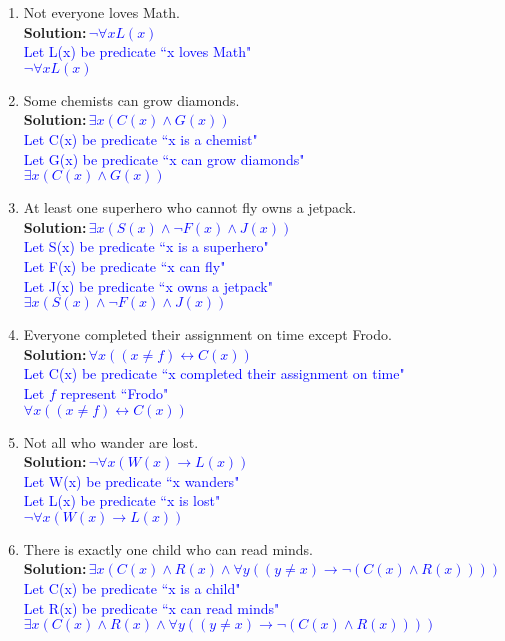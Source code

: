 \documentclass{article}
\renewcommand{\implies}{\rightarrow}
\newcommand{\sol}[1]{\textbf{Solution:\,}\textcolor{blue}{#1}}
\begin{document}
\begin{enumerate}
\begin{enumerate}
\item Not everyone loves Math.
\\\sol{$ \neg\forall x L(x)$
\\Let L(x) be predicate ``x loves Math"
\\$ \neg\forall x L(x)$
}
\item Some chemists can grow diamonds. 
\\\sol{$\exists x (C(x)\land G(x))$
\\Let C(x) be predicate ``x is a chemist"
\\Let G(x) be predicate ``x can grow diamonds"
\\$\exists x (C(x)\land G(x))$
}
\item At least one superhero who cannot fly owns a jetpack.
\\\sol{$\exists x (S(x)\land \neg F(x) \land J(x))$
\\Let S(x) be predicate ``x is a superhero"
\\Let F(x) be predicate ``x can fly"
\\Let J(x) be predicate ``x owns a jetpack"
\\$\exists x (S(x)\land \neg F(x) \land J(x))$
}
\item Everyone completed their assignment on time except Frodo.
\\\sol{$\forall x ((x\neq f)\leftrightarrow C(x))$
\\Let C(x) be predicate ``x completed their assignment on time"
\\Let $f$ represent ``Frodo"
\\$\forall x ((x\neq f)\leftrightarrow C(x))$
}
\item Not all who wander are lost. 
\\\sol{$\neg\forall x(W(x)\implies L(x))$
\\Let W(x) be predicate ``x wanders"
\\Let L(x) be predicate ``x is lost"
\\$\neg\forall x(W(x)\implies L(x))$
}
\item There is exactly one child who can read minds.
\\\sol{$\exists x (C(x)\land R(x) \land \forall y((y\neq x)\implies \neg (C(x)\land R(x))))$
\\Let C(x) be predicate ``x is a child"
\\Let R(x) be predicate ``x can read minds"
\\$\exists x (C(x)\land R(x) \land \forall y((y\neq x)\implies \neg (C(x)\land R(x))))$
}
\end{enumerate}


\end{enumerate}
\end{document}

